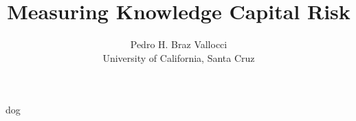 \documentclass[11pt]{article}
\begin{document}
\title{Measuring Knowledge Capital Risk} %
\author{\sffamily Pedro H. Braz Vallocci \\ \sffamily University of California, Santa Cruz} %

\maketitle %

\doublespacing %

dog

% 
\end{document}
